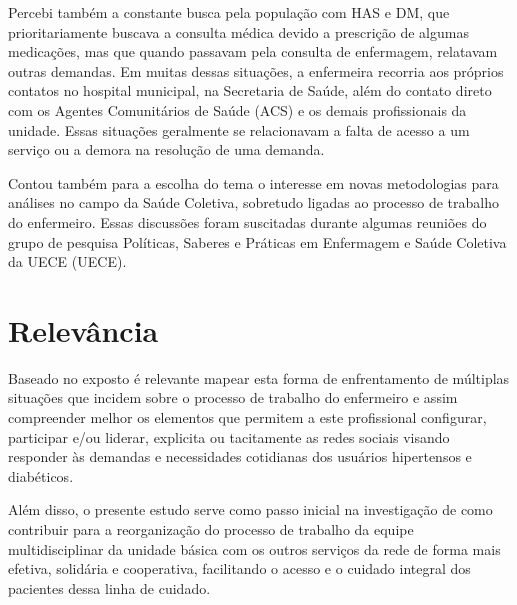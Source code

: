 Percebi também a constante busca pela população com \acrshort{HAS} e \acrshort{DM}, que prioritariamente buscava a consulta médica devido a prescrição de algumas medicações, mas que quando passavam pela consulta de enfermagem, relatavam outras demandas. Em muitas dessas situações, a enfermeira recorria aos próprios contatos no hospital municipal, na Secretaria de Saúde, além do contato direto com os Agentes Comunitários de Saúde (\acrshort{ACS}) e os demais profissionais da unidade. Essas situações geralmente se relacionavam a falta de acesso a um serviço ou a demora na resolução de uma demanda. 

Contou também para a escolha do tema o interesse em novas metodologias para análises no campo da Saúde Coletiva, sobretudo ligadas ao processo de trabalho do enfermeiro. Essas discussões foram suscitadas durante algumas reuniões do grupo de pesquisa Políticas, Saberes e Práticas em Enfermagem e Saúde Coletiva da \acrlong{UECE} (\acrshort{UECE}).  

\section{Relevância}
Baseado  no exposto é relevante mapear esta forma de enfrentamento de múltiplas situações que incidem sobre o processo de trabalho do enfermeiro e assim compreender melhor os elementos que permitem a este profissional configurar, participar e/ou liderar, explicita ou tacitamente as redes sociais visando responder às demandas e necessidades cotidianas dos usuários hipertensos e diabéticos. 

Além disso, o presente estudo serve como passo inicial na investigação de como contribuir para a reorganização do processo de trabalho da equipe multidisciplinar da unidade  básica com os outros serviços da rede de forma mais  efetiva, solidária e cooperativa, facilitando o acesso e o cuidado integral dos pacientes dessa linha de cuidado.
